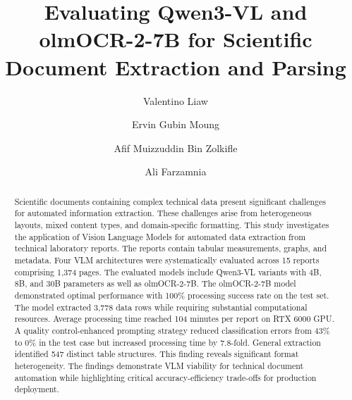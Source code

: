 \documentclass{svproc}
\begin{document}
\mainmatter

\title{Evaluating Qwen3-VL and olmOCR-2-7B for Scientific Document Extraction and Parsing}


\author{Valentino Liaw \and Ervin Gubin Moung \and Afif Muizzuddin Bin Zolkifle \and Ali Farzamnia}




\maketitle

\begin{abstract}
Scientific documents containing complex technical data present significant challenges for automated information extraction. These challenges arise from heterogeneous layouts, mixed content types, and domain-specific formatting. This study investigates the application of Vision Language Models for automated data extraction from technical laboratory reports. The reports contain tabular measurements, graphs, and metadata. Four VLM architectures were systematically evaluated across 15 reports comprising 1,374 pages. The evaluated models include Qwen3-VL variants with 4B, 8B, and 30B parameters as well as olmOCR-2-7B. The olmOCR-2-7B model demonstrated optimal performance with 100\% processing success rate on the test set. The model extracted 3,778 data rows while requiring substantial computational resources. Average processing time reached 104 minutes per report on RTX 6000 GPU. A quality control-enhanced prompting strategy reduced classification errors from 43\% to 0\% in the test case but increased processing time by 7.8-fold. General extraction identified 547 distinct table structures. This finding reveals significant format heterogeneity. The findings demonstrate VLM viability for technical document automation while highlighting critical accuracy-efficiency trade-offs for production deployment.

\end{abstract}
\end{document}
